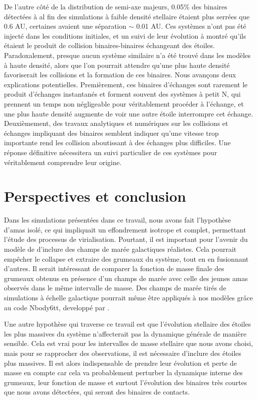 De l'autre c\^oté de la distribution de semi-axe majeurs, 0.05\% des binaires détectées à al fin des simulations à faible densité stellaire étaient plus serrées que 0.6 AU, certaines avaient une séparation $\sim$ 0.01 AU. Ces systèmes n'ont pas été injecté dans les conditions initiales, et un suivi de leur évolution à montré qu'ils étaient le produit de collision binaires-binaires échangeant des étoiles. Paradoxalement, presque aucun système similaire n'a été trouvé dans les modèles à haute densité, alors que l'on pourrait attendre qu'une plus haute densité favoriserait les collisions et la formation de ces binaires. Nous avançons deux explications potentielles. Premièrement, ces binaires d'échanges sont rarement le produit d'échanges instantanés et forment souvent des systèmes à petit N, qui prennent un temps non négligeable pour véritablement procéder à l'échange, et une plus haute densité augmente de voir une autre étoile interrompre cet échange. Deuxièmement, des travaux analytiques et numériques sur les collisions et échanges impliquant des binaires semblent indiquer qu'une vitesse trop importante rend les collision aboutissant à des échanges plus difficiles. Une réponse définitive nécessitera un suivi particulier de ces systèmes pour véritablement comprendre leur origine.

\section{Perspectives et conclusion}

Dans les simulations présentées dans ce travail, nous avons fait l'hypothèse d'amas isolé, ce qui impliquait un effondrement isotrope et complet, permettant l'étude des processus de virialisation. Pourtant, il est important pour l'avenir du modèle de \HubLem d'inclure des champs de marée galactiques réalistes. Cela pourrait emp\^echer le collapse et extraire des grumeaux du système, tout en en fusionnant d'autres. Il serait intéressant de comparer la fonction de masse finale des grumeaux obtenus en présence d'un champs de marée avec celle des jeunes amas observés dans le m\^eme intervalle de masse. Des champs de marée tirés de simulations à échelle galactique pourrait même être appliqués à nos modèles gr\^ace au code Nbody6tt, developpé par \cite{Renaud2011}.

Une autre hypothèse qui traverse ce travail est que l'évolution stellaire des étoiles les plus massives du système n'affecterait pas la dynamique générale de manière sensible. Cela est vrai pour les intervalles de masse stellaire que nous avons choisi, mais pour se rapprocher des observations, il est nécessaire d'inclure des étoiles plus massives. Il est alors indispensable de prendre leur évolution et perte de masse en compte car cela va probablement perturber la dynamique interne des grumeaux, leur fonction de masse et surtout l'évolution des binaires très courtes que nous avons détectées, qui seront des binaires de contacts.

